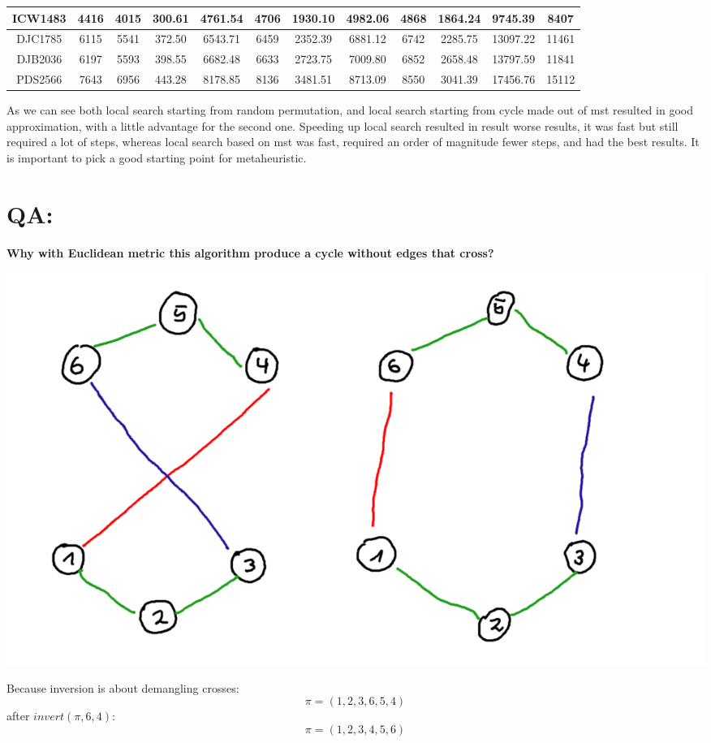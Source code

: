 \documentclass{article}
\begin{document}
\begin{center}
\begin{tabular}{| c | c | c || c | c | c || c | c | c || c | c | c ||}
        \hline
        ICW1483 & 4416 & 4015 & 300.61 & 4761.54 & 4706 & 1930.10 & 4982.06 & 4868 & 1864.24 & 9745.39 & 8407\\
        \hline
        DJC1785 & 6115 & 5541 & 372.50 & 6543.71 & 6459 & 2352.39 & 6881.12 & 6742 & 2285.75 & 13097.22 & 11461\\
        \hline
        DJB2036 & 6197 & 5593 & 398.55 & 6682.48 & 6633 & 2723.75 & 7009.80 & 6852 & 2658.48 & 13797.59 & 11841\\
        \hline
        PDS2566 & 7643 & 6956 & 443.28 & 8178.85 & 8136 & 3481.51 & 8713.09 & 8550 & 3041.39 & 17456.76 & 15112\\
        \hline
    \end{tabular}
    \end{center}
\normalsize
As we can see both local search starting from random permutation, and local search starting from cycle made out of mst resulted in good approximation, with a little advantage for the second one. Speeding up local search resulted in result worse results, it was fast but still required a lot of steps, whereas local search based on mst was fast, required an order of magnitude fewer steps, and had the best results. It is important to pick a good starting point for metaheuristic.
    \section*{QA:}
    \begin{center}
        \textbf{Why with Euclidean metric this algorithm produce a cycle without edges that cross?}
    \end{center}
    \begin{center}
        \includegraphics[scale=0.4]{first} 
    \end{center}
    Because inversion is about demangling crosses:
    \[
        \pi = (1, 2, 3, 6, 5, 4)    
    \]
    after \textit{\(invert(\pi, 6, 4)\)}:
    \[
        \pi = (1, 2, 3, 4, 5, 6)    
    \]
\end{document}
